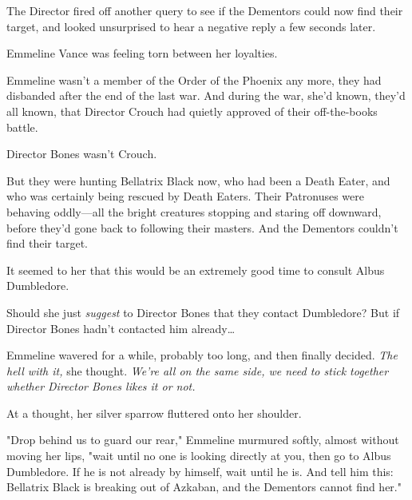 The Director fired off another query to see if the Dementors could now find 
their target, and looked unsurprised to hear a negative reply a few seconds 
later.

Emmeline Vance was feeling torn between her loyalties.

Emmeline wasn't a member of the Order of the Phoenix any more, they had 
disbanded after the end of the last war. And during the war, she'd known, 
they'd all known, that Director Crouch had quietly approved of their 
off-the-books battle.

Director Bones wasn't Crouch.

But they were hunting Bellatrix Black now, who had been a Death Eater, and who 
was certainly being rescued by Death Eaters. Their Patronuses were behaving 
oddly---all the bright creatures stopping and staring off downward, before 
they'd gone back to following their masters. And the Dementors couldn't find 
their target.

It seemed to her that this would be an extremely good time to consult Albus 
Dumbledore.

Should she just \emph{suggest} to Director Bones that they contact Dumbledore? 
But if Director Bones hadn't contacted him already{\ldots}

Emmeline wavered for a while, probably too long, and then finally decided. 
\emph{The hell with it,} she thought. \emph{We're all on the same side, we need 
to stick together whether Director Bones likes it or not.}

At a thought, her silver sparrow fluttered onto her shoulder.

"Drop behind us to guard our rear," Emmeline murmured softly, almost without 
moving her lips, "wait until no one is looking directly at you, then go to 
Albus Dumbledore. If he is not already by himself, wait until he is. And tell 
him this: Bellatrix Black is breaking out of Azkaban, and the Dementors cannot 
find her."

